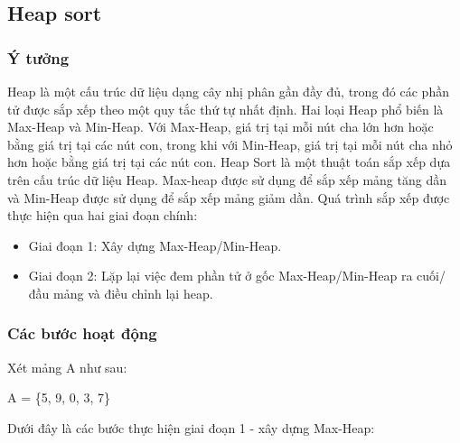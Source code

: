 \subsection{Heap sort}

\subsubsection{Ý tưởng}
Heap là một cấu trúc dữ liệu dạng cây nhị phân gần đầy đủ, trong đó các phần tử được sắp xếp theo một quy tắc thứ tự nhất định. Hai loại Heap phổ biến là Max-Heap và Min-Heap. Với Max-Heap, giá trị tại mỗi nút cha lớn hơn hoặc bằng giá trị tại các nút con, trong khi với Min-Heap, giá trị tại mỗi nút cha nhỏ hơn hoặc bằng giá trị tại các nút con.
Heap Sort là một thuật toán sắp xếp dựa trên cấu trúc dữ liệu Heap. Max-heap được sử dụng để sắp xếp mảng tăng dần và Min-Heap được sử dụng để sắp xếp mảng giảm dần. Quá trình sắp xếp được thực hiện qua hai giai đoạn chính: 
\begin{itemize}
    \item Giai đoạn 1: Xây dựng Max-Heap/Min-Heap.
    \item Giai đoạn 2: Lặp lại việc đem phần tử ở gốc Max-Heap/Min-Heap ra cuối/đầu mảng và điều chỉnh lại heap.
\end{itemize}

\subsubsection{Các bước hoạt động}
Xét mảng A như sau: 
\begin{center}
   A = \{5, 9, 0, 3, 7\} 
\end{center} 
Dưới đây là các bước thực hiện giai đoạn 1 - xây dựng Max-Heap:

\begin{table}[H]
\centering
{}
\caption{Các bước xây dựng Max-Heap}
\end{table}


